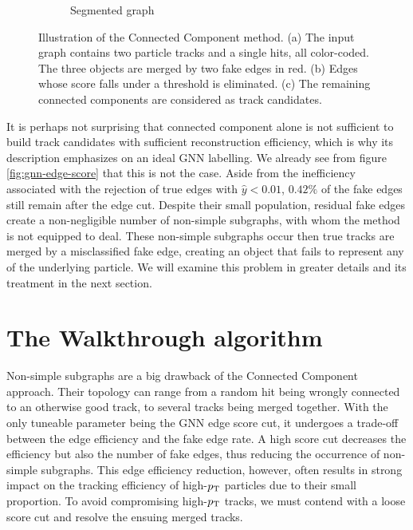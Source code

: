 \begin{figure}[h!]
\begin{subfigure}[b]{0.33\textwidth}
    \vspace{0.5cm}
    \caption{Segmented graph}
    \label{subfig:gnn-segmented-graph}
\end{subfigure}
\caption{Illustration of the Connected Component method. (a) The input graph contains two particle tracks and a single hits, all color-coded. The three objects are merged by two fake edges in red. (b) Edges whose score falls under a threshold is eliminated. (c) The remaining connected components are considered as track candidates. }
\label{fig:connected-component}
\end{figure}

It is perhaps not surprising that connected component alone is not sufficient to build track candidates with sufficient reconstruction efficiency, which is why its description emphasizes on an ideal GNN labelling.
We already see from figure \ref{fig:gnn-edge-score} that this is not the case. 
Aside from the inefficiency associated with the rejection of true edges with $\hat{y}<0.01$, $0.42\%$ of the fake edges still remain after the edge cut. 
Despite their small population, residual fake edges create a non-negligible number of non-simple subgraphs, with whom the method is not equipped to deal.
These non-simple subgraphs occur then true tracks are merged by a misclassified fake edge, creating an object that fails to represent any of the underlying particle.
We will examine this problem in greater details and its treatment in the next section.

\section{The Walkthrough algorithm}
\label{sect:walk}

Non-simple subgraphs are a big drawback of the Connected Component approach. 
Their topology can range from a random hit being wrongly connected to an otherwise good track, to several tracks being merged together. 
With the only tuneable parameter being the GNN edge score cut, it undergoes a trade-off between the edge efficiency and the fake edge rate. 
A high score cut decreases the efficiency but also the number of fake edges, thus reducing the occurrence of non-simple subgraphs. 
This edge efficiency reduction, however, often results in strong impact on the tracking efficiency of high-$p_{\text{T}}$ particles due to their small proportion. 
To avoid compromising high-$p_{\text{T}}$ tracks, we must contend with a loose score cut and resolve the ensuing merged tracks.

